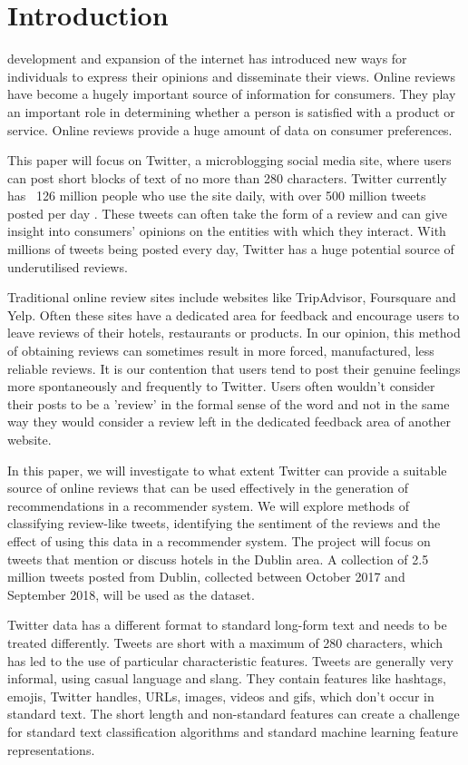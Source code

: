 \section{Introduction}
 development and expansion of the internet has introduced new ways for individuals to express their opinions and disseminate their views. Online reviews have become a hugely important source of information for consumers. They play an important role in determining whether a person is satisfied with a product or service. Online reviews provide a huge amount of data on consumer preferences. 

This paper will focus on Twitter, a microblogging social media site, where users can post short blocks of text of no more than 280 characters. Twitter currently has ~126 million people who use the site daily, with over 500 million tweets posted per day \cite{Twitter2019}. These tweets can often take the form of a review and can give insight into consumers' opinions on the entities with which they interact. With millions of tweets being posted every day, Twitter has a huge potential source of underutilised reviews.

Traditional online review sites include websites like TripAdvisor, Foursquare and Yelp. Often these sites have a dedicated area for feedback and encourage users to leave reviews of their hotels, restaurants or products. In our opinion, this method of obtaining reviews can sometimes result in more forced, manufactured, less reliable reviews. It is our contention that users tend to post their genuine feelings more spontaneously and frequently to Twitter. Users often wouldn't consider their posts to be a 'review' in the formal sense of the word and not in the same way they would consider a review left in the dedicated feedback area of another website.

In this paper, we will investigate to what extent Twitter can provide a suitable source of online reviews that can be used effectively in the generation of recommendations in a recommender system. We will explore methods of classifying review-like tweets, identifying the sentiment of the reviews and the effect of using this data in a recommender system. The project will focus on tweets that mention or discuss hotels in the Dublin area. A collection of 2.5 million tweets posted from Dublin, collected between October 2017 and September 2018, will be used as the dataset. 

Twitter data has a different format to standard long-form text and needs to be treated differently. Tweets are short with a maximum of 280 characters, which has led to the use of particular characteristic features. Tweets are generally very informal, using casual language and slang. They contain features like hashtags, emojis, Twitter handles, URLs, images, videos and gifs, which don't occur in standard text. The short length and non-standard features can create a challenge for standard text classification algorithms and standard machine learning feature representations. 

